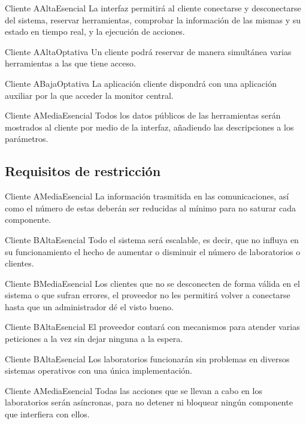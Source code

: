 {Cliente A}{Alta}{Esencial}
{
La interfaz permitirá al cliente conectarse y desconectarse del sistema, 
reservar herramientas, comprobar la información de las mismas y su 
estado en tiempo real, y la ejecución de acciones.
}

{Cliente A}{Alta}{Optativa}
{
Un cliente podrá reservar de manera simultánea varias herramientas a 
las que tiene acceso.
}

{Cliente A}{Baja}{Optativa}
{
La aplicación cliente dispondrá con una aplicación auxiliar por la que 
acceder la monitor central.
}

{Cliente A}{Media}{Esencial}
{
Todos los datos públicos de las herramientas serán mostrados al cliente 
por medio de la interfaz, añadiendo las descripciones a los parámetros.
}

\subsection{Requisitos de restricción}

{Cliente A}{Media}{Esencial}
{
La información trasmitida en las comunicaciones, así como el número 
de estas deberán ser reducidas al mínimo para no saturar cada componente.
}

{Cliente B}{Alta}{Esencial}
{
Todo el sistema será escalable, es decir, que no influya en su 
funcionamiento el hecho de aumentar o disminuir el número de 
laboratorios o clientes.
}

{Cliente B}{Media}{Esencial}
{
Los clientes que no se desconecten de forma válida en el sistema o que 
sufran errores, el proveedor no les permitirá volver a conectarse hasta 
que un administrador dé el visto bueno.
}

{Cliente B}{Alta}{Esencial}
{
El proveedor contará con mecanismos para atender varias peticiones a la 
vez sin dejar ninguna a la espera.
}

{Cliente B}{Alta}{Esencial}
{
Los laboratorios funcionarán sin problemas en diversos sistemas operativos con 
una única implementación.
}

{Cliente A}{Media}{Esencial}
{
Todas las acciones que se llevan a cabo en los laboratorios serán
asíncronas, para no detener ni bloquear ningún componente que 
interfiera con ellos.
}

